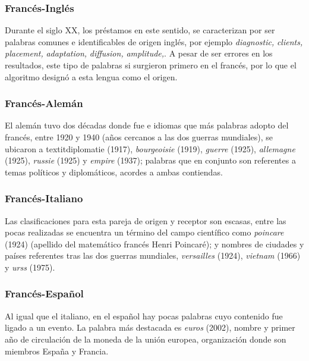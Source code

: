 \subsubsection*{Francés-Inglés}%

Durante el siglo XX, los préstamos en este sentido, se caracterizan por ser palabras comunes e identificables de origen inglés,  por ejemplo  \textit{diagnostic,} \textit{clients,} \textit{placement,} \textit{adaptation,} \textit{diffusion,} \textit{amplitude,}.  A pesar de ser errores en los resultados, este tipo de palabras si surgieron primero en el francés, por lo que el algoritmo designó a esta lengua como el origen. 

\subsubsection*{Francés-Alemán}%

El alemán tuvo dos décadas donde  fue e idiomas que más palabras adopto del francés, entre 1920 y 1940  (años cercanos a las dos guerras mundiales), se ubicaron a  textit{diplomatie} (1917), \textit{bourgeoisie} (1919),  \textit{guerre} (1925), \textit{allemagne} (1925), \textit{russie} (1925) y \textit{empire} (1937); palabras que en conjunto son referentes a temas políticos y diplomáticos, acordes a ambas contiendas. 


\subsubsection*{Francés-Italiano}%

Las clasificaciones para esta pareja de origen y receptor son escasas, entre las pocas realizadas se encuentra un término del campo científico como \textit{poincare} (1924) (apellido del matemático francés Henri Poincaré);  y nombres de ciudades y países referentes tras las dos guerras mundiales, \textit{versailles} (1924), \textit{vietnam} (1966)  y \textit{urss} (1975).


\subsubsection*{Francés-Español}%

Al igual que el italiano, en el español hay pocas palabras cuyo contenido fue ligado a un evento. La palabra más destacada es \textit{euros} (2002),
nombre y primer año de circulación de la moneda de la unión europea, organización donde son miembros España y Francia. 

